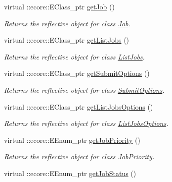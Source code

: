 \begin{DoxyCompactItemize}
\item 
virtual ::ecore::EClass\_\-ptr \hyperlink{classTMS__Data_1_1TMS__DataPackage_a5082a4afb17e44aaf93bf1b5fde3f086}{getJob} ()
\begin{DoxyCompactList}\small\item\em Returns the reflective object for class \hyperlink{classTMS__Data_1_1Job}{Job}. \item\end{DoxyCompactList}\item 
virtual ::ecore::EClass\_\-ptr \hyperlink{classTMS__Data_1_1TMS__DataPackage_aca2684a6df4261ee76a24b6ada15976c}{getListJobs} ()
\begin{DoxyCompactList}\small\item\em Returns the reflective object for class \hyperlink{classTMS__Data_1_1ListJobs}{ListJobs}. \item\end{DoxyCompactList}\item 
virtual ::ecore::EClass\_\-ptr \hyperlink{classTMS__Data_1_1TMS__DataPackage_a37b8a551fb5cca5f514c433e0c35b9d1}{getSubmitOptions} ()
\begin{DoxyCompactList}\small\item\em Returns the reflective object for class \hyperlink{classTMS__Data_1_1SubmitOptions}{SubmitOptions}. \item\end{DoxyCompactList}\item 
virtual ::ecore::EClass\_\-ptr \hyperlink{classTMS__Data_1_1TMS__DataPackage_a9c9762e838f1cae7e5e6ff71ae9828d4}{getListJobsOptions} ()
\begin{DoxyCompactList}\small\item\em Returns the reflective object for class \hyperlink{classTMS__Data_1_1ListJobsOptions}{ListJobsOptions}. \item\end{DoxyCompactList}\item 
virtual ::ecore::EEnum\_\-ptr \hyperlink{classTMS__Data_1_1TMS__DataPackage_a6bb57e6ee8d71ca711c674c7e4fcbed5}{getJobPriority} ()
\begin{DoxyCompactList}\small\item\em Returns the reflective object for class JobPriority. \item\end{DoxyCompactList}\item 
virtual ::ecore::EEnum\_\-ptr \hyperlink{classTMS__Data_1_1TMS__DataPackage_aa0837f00607373b81439bf2438a10a78}{getJobStatus} ()

\end{DoxyCompactItemize}

